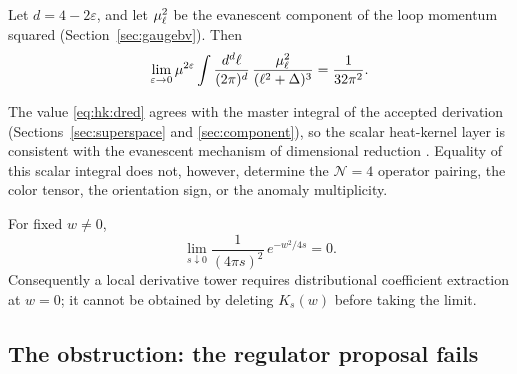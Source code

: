 \begin{lemma}
\label{lem:hk:dred}
Let $d=4-2\varepsilon$, and let $\mu_\ell^2$ be the evanescent component of the
loop momentum squared (Section~\ref{sec:gaugebv}). Then
\begin{equation}\label{eq:hk:dred}
\lim_{\varepsilon\to0}\mu^{2\varepsilon}
\int\frac{d^d\ell}{(2\pi)^d}\,
\frac{\mu_\ell^2}{(\ell^2+\Delta)^3}
=\frac{1}{32\pi^2} .
\end{equation}
\end{lemma}

\begin{remark}
The value \eqref{eq:hk:dred} agrees with the master integral of the accepted
derivation (Sections~\ref{sec:superspace} and \ref{sec:component}), so the
scalar heat-kernel layer is consistent with the evanescent mechanism of
dimensional reduction \cite{SiegelDRED}. Equality of this scalar integral does
not, however, determine the $\mathcal N=4$ operator pairing, the color tensor,
the orientation sign, or the anomaly multiplicity.
\end{remark}

\begin{lemma}
\label{lem:hk:shorttime}
For fixed $w\neq0$,
\begin{equation}\label{eq:hk:shorttime}
\lim_{s\downarrow0}\frac{1}{(4\pi s)^2}\,e^{-w^2/4s}=0 .
\end{equation}
Consequently a local derivative tower requires distributional coefficient
extraction at $w=0$; it cannot be obtained by deleting $K_s(w)$ before taking
the limit.
\end{lemma}

\subsection{The obstruction: the regulator proposal fails}
\label{subsec:hk:blocker}

